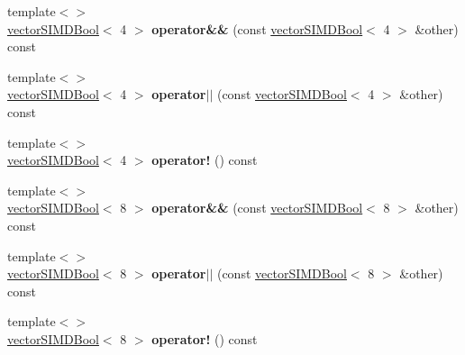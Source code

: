 \begin{DoxyCompactItemize}
\item 
{\footnotesize template$<$$>$ }\\\hyperlink{classirr_1_1core_1_1vectorSIMDBool}{vector\+S\+I\+M\+D\+Bool}$<$ 4 $>$ {\bfseries operator\&\&} (const \hyperlink{classirr_1_1core_1_1vectorSIMDBool}{vector\+S\+I\+M\+D\+Bool}$<$ 4 $>$ \&other) const\hypertarget{classirr_1_1core_1_1vectorSIMDBool_a6c8e6108571902f57ec2e65162424706}{}\label{classirr_1_1core_1_1vectorSIMDBool_a6c8e6108571902f57ec2e65162424706}

\item 
{\footnotesize template$<$$>$ }\\\hyperlink{classirr_1_1core_1_1vectorSIMDBool}{vector\+S\+I\+M\+D\+Bool}$<$ 4 $>$ {\bfseries operator$\vert$$\vert$} (const \hyperlink{classirr_1_1core_1_1vectorSIMDBool}{vector\+S\+I\+M\+D\+Bool}$<$ 4 $>$ \&other) const\hypertarget{classirr_1_1core_1_1vectorSIMDBool_af616573f20a489a98140181cb2699ffb}{}\label{classirr_1_1core_1_1vectorSIMDBool_af616573f20a489a98140181cb2699ffb}

\item 
{\footnotesize template$<$$>$ }\\\hyperlink{classirr_1_1core_1_1vectorSIMDBool}{vector\+S\+I\+M\+D\+Bool}$<$ 4 $>$ {\bfseries operator!} () const\hypertarget{classirr_1_1core_1_1vectorSIMDBool_afd9d69789b413cc3296564990648c6f4}{}\label{classirr_1_1core_1_1vectorSIMDBool_afd9d69789b413cc3296564990648c6f4}

\item 
{\footnotesize template$<$$>$ }\\\hyperlink{classirr_1_1core_1_1vectorSIMDBool}{vector\+S\+I\+M\+D\+Bool}$<$ 8 $>$ {\bfseries operator\&\&} (const \hyperlink{classirr_1_1core_1_1vectorSIMDBool}{vector\+S\+I\+M\+D\+Bool}$<$ 8 $>$ \&other) const\hypertarget{classirr_1_1core_1_1vectorSIMDBool_abb46836ea8cdc8019907030db4d8435a}{}\label{classirr_1_1core_1_1vectorSIMDBool_abb46836ea8cdc8019907030db4d8435a}

\item 
{\footnotesize template$<$$>$ }\\\hyperlink{classirr_1_1core_1_1vectorSIMDBool}{vector\+S\+I\+M\+D\+Bool}$<$ 8 $>$ {\bfseries operator$\vert$$\vert$} (const \hyperlink{classirr_1_1core_1_1vectorSIMDBool}{vector\+S\+I\+M\+D\+Bool}$<$ 8 $>$ \&other) const\hypertarget{classirr_1_1core_1_1vectorSIMDBool_a4efef7164e45d921dfbb37d1a9e699b8}{}\label{classirr_1_1core_1_1vectorSIMDBool_a4efef7164e45d921dfbb37d1a9e699b8}

\item 
{\footnotesize template$<$$>$ }\\\hyperlink{classirr_1_1core_1_1vectorSIMDBool}{vector\+S\+I\+M\+D\+Bool}$<$ 8 $>$ {\bfseries operator!} () const\hypertarget{classirr_1_1core_1_1vectorSIMDBool_a9ff74f4c14d2bee4fa17a3ec70d1ee40}{}\label{classirr_1_1core_1_1vectorSIMDBool_a9ff74f4c14d2bee4fa17a3ec70d1ee40}

\end{DoxyCompactItemize}
